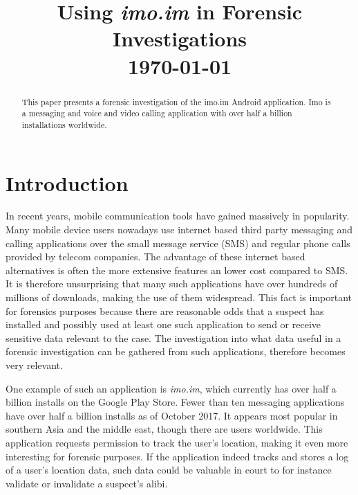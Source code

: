 \documentclass[conference]{IEEEtran}
\begin{document}
\title{Using {\it imo.im} in Forensic Investigations \\\vspace{5mm} \large  \today}
\author{
\and
{}
}
\maketitle
\thispagestyle{plain}
\pagestyle{plain}

\begin{abstract}
    This paper presents a forensic investigation of the imo.im Android
    application. Imo is a messaging and voice and video calling application with
    over half a billion installations worldwide. %
\end{abstract}

\section{Introduction}

In recent years, mobile communication tools have gained massively in popularity.
Many mobile device users nowadays use internet based third party messaging and
calling applications over the small message service (SMS) and regular phone
calls provided by telecom companies.  The advantage of these internet based
alternatives is often the more extensive features an lower cost compared to SMS.
It is therefore unsurprising that many such applications have over hundreds of
millions of downloads, making the use of them widespread. This fact is important
for forensics purposes because there are reasonable odds that a suspect has
installed and possibly used at least one such application to send or receive
sensitive data relevant to the case. The investigation into what data useful in
a forensic investigation can be gathered from such applications, therefore
becomes very relevant.

One example of such an application is {\it imo.im}, which currently has over
half a billion installs on the Google Play Store. Fewer than ten messaging
applications have over half a billion installs as of October
2017\cite{wiki-gplay-popular}. It appears most popular in southern Asia and the
middle east, though there are users worldwide\footnotemark. This application
requests permission to track the user's location, making it even more
interesting for forensic purposes. If the application indeed tracks and stores
a log of a user's location data, such data could be valuable in court to for
instance validate or invalidate a suspect's alibi.
\end{document}
